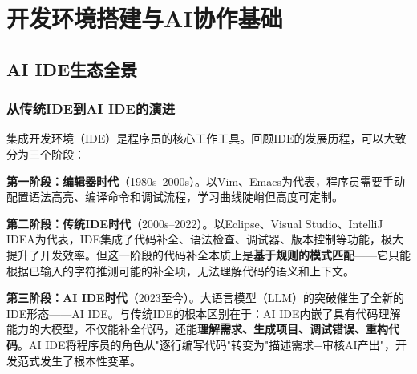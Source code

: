 
\chapter{开发环境搭建与AI协作基础}


\section{AI IDE生态全景}

\subsection{从传统IDE到AI IDE的演进}

集成开发环境（IDE）是程序员的核心工作工具。回顾IDE的发展历程，可以大致分为三个阶段：

\textbf{第一阶段：编辑器时代}（1980s--2000s）。以Vim、Emacs为代表，程序员需要手动配置语法高亮、编译命令和调试流程，学习曲线陡峭但高度可定制。

\textbf{第二阶段：传统IDE时代}（2000s--2022）。以Eclipse、Visual Studio、IntelliJ IDEA为代表，IDE集成了代码补全、语法检查、调试器、版本控制等功能，极大提升了开发效率。但这一阶段的代码补全本质上是\textbf{基于规则的模式匹配}——它只能根据已输入的字符推测可能的补全项，无法理解代码的语义和上下文。

\textbf{第三阶段：AI IDE时代}（2023至今）。大语言模型（LLM）的突破催生了全新的IDE形态——AI IDE。与传统IDE的根本区别在于：AI IDE内嵌了具有代码理解能力的大模型，不仅能补全代码，还能\textbf{理解需求、生成项目、调试错误、重构代码}。AI IDE将程序员的角色从"逐行编写代码"转变为"描述需求+审核AI产出"，开发范式发生了根本性变革。

